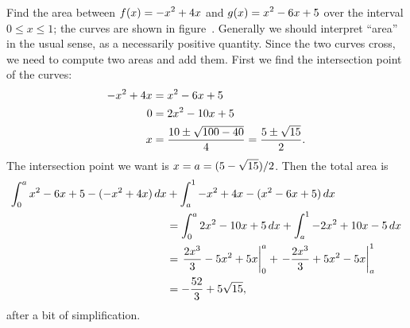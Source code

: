 
\begin{example} Find the area between $\displaystyle f(x)= -x^2+4x$ and
$\displaystyle g(x)=x^2-6x+5$ over the interval $0\le x\le 1$; the
curves are shown in figure~. Generally we
should interpret ``area'' in the usual sense, as a necessarily
positive quantity. Since the two curves cross, we need to compute two 
areas and add them. First we find the intersection point of the
curves:
\begin{align*}
  -x^2+4x&=x^2-6x+5 \\
  0&=2x^2-10x+5 \\
  x&={10\pm\sqrt{100-40}\over4}={5\pm\sqrt{15}\over2}. \\
\end{align*}
The intersection point we want is $\displaystyle x=a=(5-\sqrt{15})/2$. Then
the total area is 
\begin{align*}
  \int_0^a x^2-6x+5-(-x^2+4x)\,dx&+\int_a^1 -x^2+4x-(x^2-6x+5)\,dx \\
  &=\int_0^a 2x^2-10x+5\,dx+\int_a^1 -2x^2+10x-5\,dx \\
  &=\left.{2x^3\over3}-5x^2+5x\right|_0^a + 
    \left.-{2x^3\over3}+5x^2-5x\right|_a^1 \\
  &=-{52\over3}+5\sqrt{15},
\end{align*}
after a bit of simplification.
\end{example}

